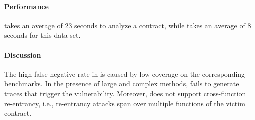 \paragraph{Performance}
\mythril takes an average of 23 seconds to analyze a contract, 
while \toolname takes an average of 8 seconds for this data set.
\paragraph{Discussion} 

The high false negative rate in \mythril is caused by low coverage on the
corresponding benchmarks. In the presence of large and complex
methods, \mythril fails to generate traces that trigger the vulnerability.
Moreover, \mythril does not support cross-function re-entrancy, i.e., re-entrancy attacks span over multiple functions of the
victim contract. 


